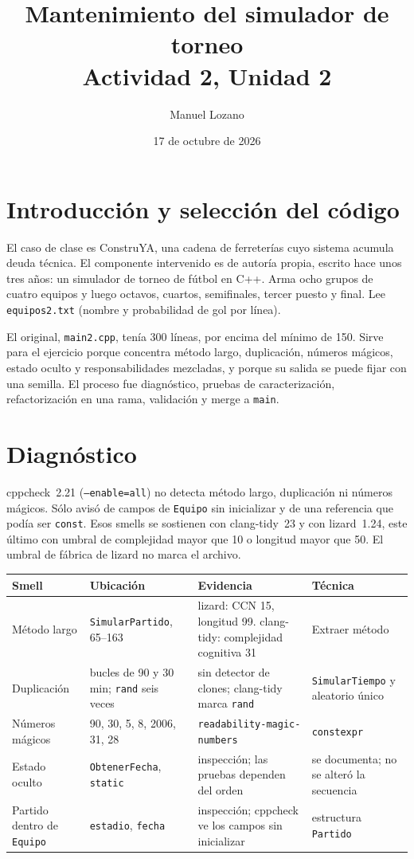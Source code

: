 \documentclass[10pt,a4paper]{article}
\title{\vspace{-1.2em}Mantenimiento del simulador de torneo\\{\large Actividad 2, Unidad 2}}
\author{Manuel Lozano}
\date{17 de octubre de 2026}
\begin{document}
\maketitle
\vspace{-2.2em}

\section{Introducci\'on y selecci\'on del c\'odigo}
El caso de clase es ConstruYA, una cadena de ferreter\'ias cuyo sistema acumula deuda t\'ecnica. El componente intervenido es de autor\'ia propia, escrito hace unos tres a\~nos: un simulador de torneo de f\'utbol en C++. Arma ocho grupos de cuatro equipos y luego octavos, cuartos, semifinales, tercer puesto y final. Lee \texttt{equipos2.txt} (nombre y probabilidad de gol por l\'inea).

El original, \texttt{main2.cpp}, ten\'ia 300 l\'ineas, por encima del m\'inimo de 150. Sirve para el ejercicio porque concentra m\'etodo largo, duplicaci\'on, n\'umeros m\'agicos, estado oculto y responsabilidades mezcladas, y porque su salida se puede fijar con una semilla. El proceso fue diagn\'ostico, pruebas de caracterizaci\'on, refactorizaci\'on en una rama, validaci\'on y merge a \texttt{main}.

\section{Diagn\'ostico}
cppcheck~2.21 (\texttt{--enable=all}) no detecta m\'etodo largo, duplicaci\'on ni n\'umeros m\'agicos. S\'olo avis\'o de campos de \texttt{Equipo} sin inicializar y de una referencia que pod\'ia ser \texttt{const}. Esos smells se sostienen con clang-tidy~23 y con lizard~1.24, este \'ultimo con umbral de complejidad mayor que 10 o longitud mayor que 50. El umbral de f\'abrica de lizard no marca el archivo.

\begin{center}
\scriptsize
\begin{tabular}{|p{2.5cm}|p{3.3cm}|p{4.2cm}|p{4.4cm}|}
\hline
Smell & Ubicaci\'on & Evidencia & T\'ecnica \\
\hline
M\'etodo largo & \texttt{SimularPartido}, 65--163 & lizard: CCN 15, longitud 99. clang-tidy: complejidad cognitiva 31 & Extraer m\'etodo \\
\hline
Duplicaci\'on & bucles de 90 y 30 min; \texttt{rand} seis veces & sin detector de clones; clang-tidy marca \texttt{rand} & \texttt{SimularTiempo} y aleatorio \'unico \\
\hline
N\'umeros m\'agicos & 90, 30, 5, 8, 2006, 31, 28 & \texttt{readability-magic-numbers} & \texttt{constexpr} \\
\hline
Estado oculto & \texttt{ObtenerFecha}, \texttt{static} & inspecci\'on; las pruebas dependen del orden & se documenta; no se alter\'o la secuencia \\
\hline
Partido dentro de \texttt{Equipo} & \texttt{estadio}, \texttt{fecha} & inspecci\'on; cppcheck ve los campos sin inicializar & estructura \texttt{Partido} \\
\hline
\end{tabular}
\end{center}
\end{document}
